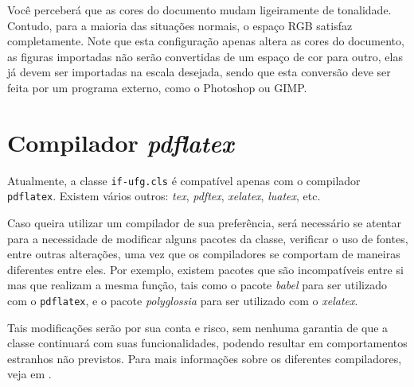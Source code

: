 Você perceberá que as cores do documento mudam ligeiramente de tonalidade. Contudo, para a maioria das situações normais, o espaço RGB satisfaz completamente. Note que esta configuração apenas altera as cores do documento, as figuras importadas não serão convertidas de um espaço de cor para outro, elas já devem ser importadas na escala desejada, sendo que esta conversão deve ser feita por um programa externo, como o Photoshop ou GIMP.

\section{Compilador \textit{pdflatex}}

Atualmente, a classe \texttt{if-ufg.cls} é compatível apenas com o compilador \texttt{pdflatex}. Existem vários outros: \emph{tex}, \emph{pdftex}, \emph{xelatex}, \emph{luatex}, etc.

Caso queira utilizar um compilador de sua preferência, será necessário se atentar para a necessidade de modificar alguns pacotes da classe, verificar o uso de fontes, entre outras alterações, uma vez que os compiladores se comportam de maneiras diferentes entre eles. Por exemplo, existem pacotes que são incompatíveis entre si mas que realizam a mesma função, tais como o pacote \emph{babel} para ser utilizado com o \texttt{pdflatex}, e o pacote \emph{polyglossia} para ser utilizado com o \emph{xelatex}. 

Tais modificações serão por sua conta e risco, sem nenhuma garantia de que a classe continuará com suas funcionalidades, podendo resultar em comportamentos estranhos não previstos. Para mais informações sobre os diferentes compiladores, veja em .